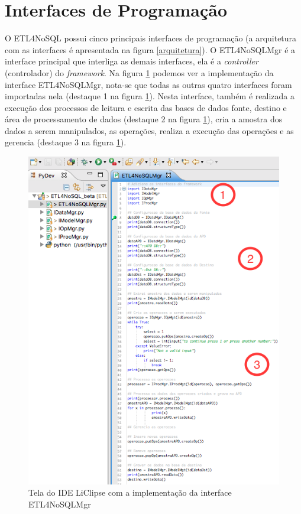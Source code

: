 \section{Interfaces de Programação}

O ETL4NoSQL possui cinco principais interfaces de programação (a arquitetura com as interfaces é apresentada na figura \ref{arquitetura}). O ETL4NoSQLMgr é a interface principal que interliga as demais interfaces, ela é a \textit{controller} (controlador) do \textit{framework}. Na figura \ref{etl4nosqlmgr} podemos ver a implementação da interface ETL4NoSQLMgr, nota-se que todas as outras quatro interfaces foram importadas nela (destaque 1 na figura \ref{etl4nosqlmgr}). Nesta interface, também é realizada a execução dos processos de leitura e escrita das bases de dados fonte, destino e área de processamento de dados (destaque 2 na figura \ref{etl4nosqlmgr}), cria a amostra dos dados a serem manipulados, as operações, realiza a execução das operações e as gerencia (destaque 3 na figura \ref{etl4nosqlmgr}).

\begin{figure}[h!]
	\centering
	\includegraphics[scale=0.8]{fig/etl4nosqlmgr.png}
	\caption{Tela do IDE LiClipse com a implementação da interface ETL4NoSQLMgr}
	\label{etl4nosqlmgr}
\end{figure}

